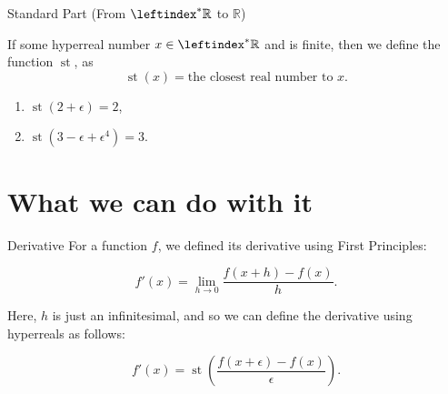 \documentclass{beamer}
\DeclareMathOperator{\st}{st}
\newcommand{\ls}{\leftindex^*}
\newcommand{\RR}{\mathbb{R}}
\newcommand{\HR}{\ls{\RR}}
\begin{document}
\begin{frame}{Standard Part (From \(\HR\) to \(\RR\))} \pause
    \begin{definition}
        If some hyperreal number \(x \in \HR\) and is finite, then we define the function \(\st\), as
        \[
            \st (x) = \text{the closest real number to \(x\)}.
        \]
    \end{definition} \pause

    \begin{examples}
        \begin{enumerate}
            \item \(\st (2 + \epsilon) = 2\), \pause
            \item \(\st (3 - \epsilon + \epsilon^4) = 3\).
        \end{enumerate}
    \end{examples}

\end{frame}

\section{What we can do with it}

\begin{frame}{Derivative}
    For a function \(f\), we defined its derivative using First Principles:
    \begin{definition}
        \[
            f'(x) = \lim_{h \to 0} \frac{f(x+h) - f(x)}{h}.
        \]
    \end{definition}\pause

    Here, \(h\) is just an infinitesimal, and so we can define the derivative using hyperreals as follows:
    \begin{definition}
        \[
            f'(x) = \st\left(\frac{f(x + \epsilon) - f(x)}{\epsilon}\right).
        \]
    \end{definition}
\end{frame}
\end{document}
